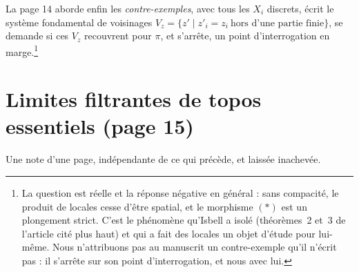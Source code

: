 \documentclass[11pt,a4paper]{article}
\begin{document}
La page 14 aborde enfin les \emph{contre-exemples}, avec tous les $X_{i}$
discrets, écrit le système fondamental de voisinages
$V_{z} = \{z' \mid z'_{i} = z_{i}\ \text{hors d'une partie finie}\}$, se demande
si ces $V_{z}$ recouvrent pour $\pi$, et s'arrête, un point d'interrogation en
marge.\footnote{La question est réelle et la réponse négative en général : sans
compacité, le produit de locales cesse d'être spatial, et le morphisme $(*)$
est un plongement strict. C'est le phénomène qu'Isbell a isolé (théorèmes~2 et~3 de l'article cité plus haut) et qui a fait
des locales un objet d'étude pour lui-même. Nous n'attribuons pas au manuscrit
un contre-exemple qu'il n'écrit pas : il s'arrête sur son point
d'interrogation, et nous avec lui.}

\section*{Limites filtrantes de topos essentiels (page 15)}

Une note d'une page, indépendante de ce qui précède, et laissée inachevée.
\end{document}
